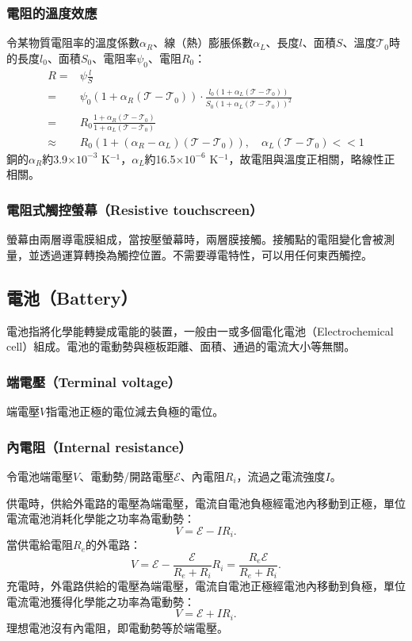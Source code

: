 \documentclass[a4paper,12pt]{report}
\begin{document}
\begin{itemize}
\subsubsection{電阻的溫度效應}
令某物質電阻率的溫度係數$\alpha_R$、線（熱）膨脹係數$\alpha_L$、長度$l$、面積$S$、溫度$\mathscr{T}_0$時的長度$l_0$、面積$S_0$、電阻率$\psi_0$、電阻$R_0$：
\[\begin{aligned}
R=&\psi\frac{l}{S}\\
=&\psi_0(1+\alpha_R(\mathscr{T}-\mathscr{T}_0))\cdot\frac{l_0(1+\alpha_L(\mathscr{T}-\mathscr{T}_0))}{S_0(1+\alpha_L(\mathscr{T}-\mathscr{T}_0))^2}\\
=&R_0\frac{1+\alpha_R(\mathscr{T}-\mathscr{T}_0)}{1+\alpha_L(\mathscr{T}-\mathscr{T}_0)}\\
\approx & R_0(1+(\alpha_R-\alpha_L)(\mathscr{T}-\mathscr{T}_0)),\quad \alpha_L(\mathscr{T}-\mathscr{T}_0)<<1
\end{aligned}\]
銅的$\alpha_R$約3.9$\times 10^{-3}$ K$^{-1}$，$\alpha_L$約16.5$\times 10^{-6}$ K$^{-1}$，故電阻與溫度正相關，略線性正相關。
\subsubsection{電阻式觸控螢幕（Resistive touchscreen）}
螢幕由兩層導電膜組成，當按壓螢幕時，兩層膜接觸。接觸點的電阻變化會被測量，並透過運算轉換為觸控位置。不需要導電特性，可以用任何東西觸控。
\subsection{電池（Battery）}
電池指將化學能轉變成電能的裝置，一般由一或多個電化電池（Electrochemical cell）組成。電池的電動勢與極板距離、面積、通過的電流大小等無關。
\subsubsection{端電壓（Terminal voltage）}
端電壓$V$指電池正極的電位減去負極的電位。
\subsubsection{內電阻（Internal resistance）}
令電池端電壓$V$、電動勢/開路電壓$\mathcal{E}$、內電阻$R_i$，流過之電流強度$I$。

供電時，供給外電路的電壓為端電壓，電流自電池負極經電池內移動到正極，單位電流電池消耗化學能之功率為電動勢：
\[V=\mathcal{E}-IR_i.\]
當供電給電阻$R_e$的外電路：
\[V=\mathcal{E}-\frac{\mathcal{E}}{R_e+R_i}R_i=\frac{R_e\mathcal{E}}{R_e+R_i}.\]
充電時，外電路供給的電壓為端電壓，電流自電池正極經電池內移動到負極，單位電流電池獲得化學能之功率為電動勢：
\[V=\mathcal{E}+IR_i.\]
理想電池沒有內電阻，即電動勢等於端電壓。


\end{itemize}
\end{document}
